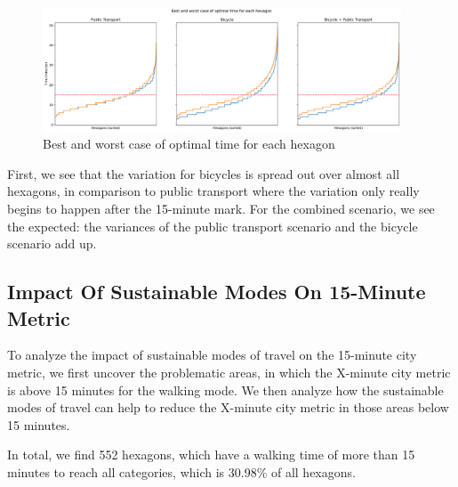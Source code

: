 \begin{figure}
  \begin{center}
    \includegraphics[width=0.95\textwidth]{Figures/results/uncertainty/optimal_best_worst_case}
  \end{center}
  \caption{Best and worst case of optimal time for each hexagon}
  \label{fig:best_and_worst_case_of_optimal_time_for_each_hexagon}
\end{figure}

First, we see that the variation for bicycles is spread out over almost all hexagons, in comparison to public transport where the variation only really begins to happen after the 15-minute mark.
For the combined scenario, we see the expected: the variances of the public transport scenario and the bicycle scenario add up.

\subsection{Impact Of Sustainable Modes On 15-Minute Metric}
\label{subsec:impact_of_sustainable_modes_on_15_minute_metric}

To analyze the impact of sustainable modes of travel on the 15-minute city metric, we first uncover the problematic areas, in which the X-minute city metric is above 15 minutes for the walking mode.
We then analyze how the sustainable modes of travel can help to reduce the X-minute city metric in those areas below 15 minutes.

In total, we find 552 hexagons, which have a walking time of more than 15 minutes to reach all categories, which is 30.98\% of all hexagons.

